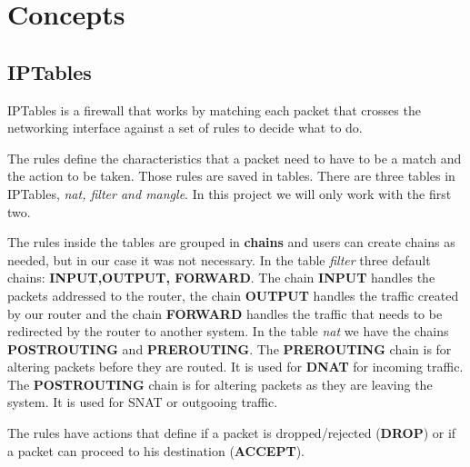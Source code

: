 \documentclass{article}
\begin{document}
\section{Concepts}
\subsection{IPTables}
\quad IPTables is a firewall that works by matching each packet that crosses the networking interface against a set of rules to decide what to do.\par
The rules define the characteristics that a packet need to have to be a match and the action to be taken.
Those rules are saved in tables. There are three tables in IPTables, \textit{nat, filter and mangle}. In this project we will only work with the first two.\par
The rules inside the tables are grouped in \textbf{chains} and users can create chains as needed, but in our case it was not necessary. In the table \textit{filter} three default chains: \textbf{INPUT,OUTPUT, FORWARD}. The chain \textbf{INPUT} handles the packets addressed to the router, the chain \textbf{OUTPUT} handles the traffic created by our router and the chain \textbf{FORWARD} handles the traffic that needs to be redirected by the router to another system. In the table \textit{nat} we have the chains \textbf{POSTROUTING} and \textbf{PREROUTING}. The \textbf{PREROUTING} chain is for altering packets before they are routed. It is used for \textbf{DNAT} for incoming traffic. The \textbf{POSTROUTING} chain is for altering packets as they are leaving the system. It is used for SNAT or outgooing traffic.\par
The rules have actions that define if a packet is dropped/rejected (\textbf{DROP}) or if a packet can proceed to his destination (\textbf{ACCEPT}).
\end{document}

